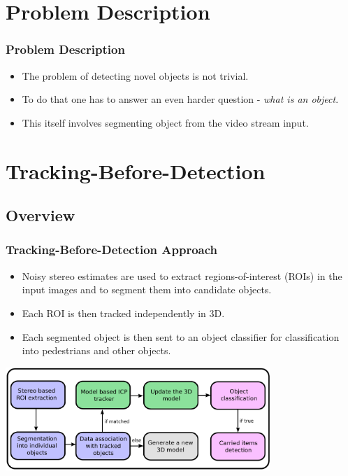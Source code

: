 \documentclass{beamer}
\begin{document}
\section{Problem Description}
\begin{frame}
\frametitle{Problem Description} 
\begin{itemize}
  \item The problem of detecting novel objects is not trivial.
  \item To do that one has to answer an even harder question - \emph{what is an object}.
  \item This itself involves segmenting object from the video stream input.
\end{itemize}
\end{frame}


\section{Tracking-Before-Detection}
\subsection{Overview}
\begin{frame}
\frametitle{Tracking-Before-Detection Approach} 
\begin{itemize}
  \item Noisy stereo estimates are used to extract regions-of-interest (ROIs) in the input images and to segment them into candidate objects.
  \item Each ROI is then tracked independently in 3D.
  \item Each segmented object is then sent to an object classifier for classification into pedestrians and other objects.
\end{itemize}
\begin{center}
  	\includegraphics[width=10cm]{overview.pdf}
	\end{center}
\end{frame}

\end{document}
